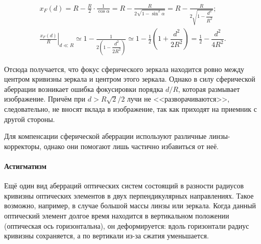 \begin{gather*}
	x_F(d) = R - \frac{R}{2} \cdot \frac{1}{\cos\alpha} = R - \frac{R}{2\sqrt{1 - \sin^2 \alpha}}  = R  - \frac{R}{2\sqrt{1 - \dfrac{d^2}{R^2}}};\\
	\left. \frac{x_F(d)}{R} \right|_{d \ll R} \simeq  1  - \frac{1}{2\left(1 - \dfrac{d^2}{2R^2} \right)} \simeq  1 - \frac{1}{2}\left(1 + \dfrac{d^2}{2R^2} \right)  = \frac{1}{2} -  \dfrac{d^2}{4R^2}.
\end{gather*}
\begin{figure}
	\centering
	\vspace{-.5pc}
	\caption{}
\end{figure}
Отсюда получается, что фокус сферического зеркала находится ровно между центром кривизны зеркала и центром этого зеркала. Однако в силу сферической аберрации возникает ошибка фокусировки порядка $d/R$, которая размывает изображение. Причём при $d > R\sqrt{2}/2$ лучи не <<разворачиваются>>, следовательно, не вносят вклада в изображение, так как приходят на приемник с другой стороны.

Для компенсации сферической аберрации используют различные линзы-корректоры, однако они помогают лишь частично избавиться от неё. 


\paragraph{Астигматизм} Ещё один вид аберраций оптических систем состоящий в разности радиусов кривизны оптических элементов в двух перпендикулярных направлениях. Такое возможно, например, в случае большой массы линзы или зеркала. Когда данный оптический элемент долгое время находится в вертикальном положении (оптическая ось горизонтальна), он деформируется: вдоль горизонтали радиус кривизны сохраняется, а по вертикали из-за сжатия уменьшается.

